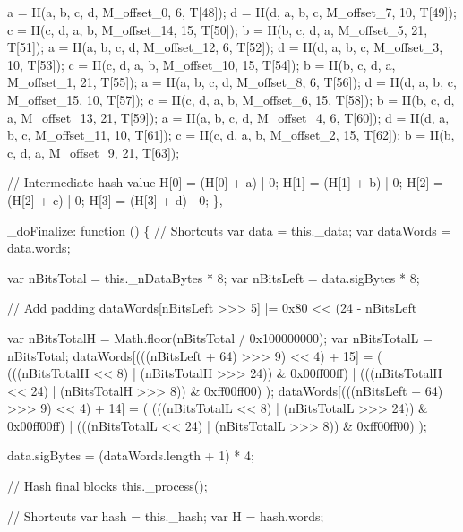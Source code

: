 \begin{DoxyCodeInclude}
            a = II(a, b, c, d, M\_offset\_0,  6,  T[48]);
            d = II(d, a, b, c, M\_offset\_7,  10, T[49]);
            c = II(c, d, a, b, M\_offset\_14, 15, T[50]);
            b = II(b, c, d, a, M\_offset\_5,  21, T[51]);
            a = II(a, b, c, d, M\_offset\_12, 6,  T[52]);
            d = II(d, a, b, c, M\_offset\_3,  10, T[53]);
            c = II(c, d, a, b, M\_offset\_10, 15, T[54]);
            b = II(b, c, d, a, M\_offset\_1,  21, T[55]);
            a = II(a, b, c, d, M\_offset\_8,  6,  T[56]);
            d = II(d, a, b, c, M\_offset\_15, 10, T[57]);
            c = II(c, d, a, b, M\_offset\_6,  15, T[58]);
            b = II(b, c, d, a, M\_offset\_13, 21, T[59]);
            a = II(a, b, c, d, M\_offset\_4,  6,  T[60]);
            d = II(d, a, b, c, M\_offset\_11, 10, T[61]);
            c = II(c, d, a, b, M\_offset\_2,  15, T[62]);
            b = II(b, c, d, a, M\_offset\_9,  21, T[63]);

            \textcolor{comment}{// Intermediate hash value}
            H[0] = (H[0] + a) | 0;
            H[1] = (H[1] + b) | 0;
            H[2] = (H[2] + c) | 0;
            H[3] = (H[3] + d) | 0;
        \},

        \_doFinalize: \textcolor{keyword}{function} () \{
            \textcolor{comment}{// Shortcuts}
            var data = this.\_data;
            var dataWords = data.words;

            var nBitsTotal = this.\_nDataBytes * 8;
            var nBitsLeft = data.sigBytes * 8;

            \textcolor{comment}{// Add padding}
            dataWords[nBitsLeft >>> 5] |= 0x80 << (24 - nBitsLeft %

            var nBitsTotalH = Math.floor(nBitsTotal / 0x100000000);
            var nBitsTotalL = nBitsTotal;
            dataWords[(((nBitsLeft + 64) >>> 9) << 4) + 15] = (
                (((nBitsTotalH << 8)  | (nBitsTotalH >>> 24)) & 0x00ff00ff) |
                (((nBitsTotalH << 24) | (nBitsTotalH >>> 8))  & 0xff00ff00)
            );
            dataWords[(((nBitsLeft + 64) >>> 9) << 4) + 14] = (
                (((nBitsTotalL << 8)  | (nBitsTotalL >>> 24)) & 0x00ff00ff) |
                (((nBitsTotalL << 24) | (nBitsTotalL >>> 8))  & 0xff00ff00)
            );

            data.sigBytes = (dataWords.length + 1) * 4;

            \textcolor{comment}{// Hash final blocks}
            this.\_process();

            \textcolor{comment}{// Shortcuts}
            var hash = this.\_hash;
            var H = hash.words;


\end{DoxyCodeInclude}
